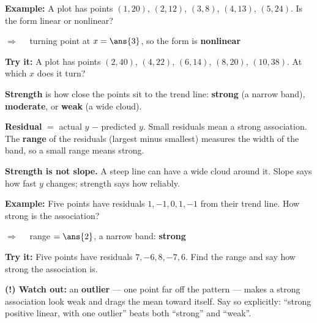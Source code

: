 \documentclass[12pt]{article}
\begin{document}
\begin{examplebox}
\textbf{Example:} \quad A plot has points $(1, 20)$, $(2, 12)$, $(3, 8)$, $(4, 13)$,
$(5, 24)$. Is the form linear or nonlinear?

$\Rightarrow\quad$ turning point at $x = \ans{3}$, so the form is \textbf{nonlinear}
\end{examplebox}

\begin{tryitbox}
\textbf{Try it:} \quad A plot has points $(2, 40)$, $(4, 22)$, $(6, 14)$, $(8, 20)$,
$(10, 38)$. At which $x$ does it turn?\\[2pt]
\end{tryitbox}


\begin{formulabox}
\textbf{Strength} is how close the points sit to the trend line: \textbf{strong} (a narrow
band), \textbf{moderate}, or \textbf{weak} (a wide cloud).\par
\smallskip
\textbf{Residual} $=$ actual $y$ $-$ predicted $y$. Small residuals mean a strong
association. The \textbf{range} of the residuals (largest minus smallest) measures the
width of the band, so a small range means strong.\par
\smallskip
\textbf{Strength is not slope.} A steep line can have a wide cloud around it. Slope says how
fast $y$ changes; strength says how reliably.
\end{formulabox}

\begin{examplebox}
\textbf{Example:} \quad Five points have residuals $1, -1, 0, 1, -1$ from their trend line.
How strong is the association?

$\Rightarrow\quad$ range $= \ans{2}$, a narrow band: \textbf{strong}
\end{examplebox}

\begin{tryitbox}
\textbf{Try it:} \quad Five points have residuals $7, -6, 8, -7, 6$. Find the range and say
how strong the association is.\\[2pt]
\end{tryitbox}

\begin{watchoutbox}
\textbf{(!) Watch out:} an \textbf{outlier} --- one point far off the pattern --- makes a
strong association look weak and drags the mean toward itself. Say so explicitly:
``strong positive linear, with one outlier'' beats both ``strong'' and ``weak''.
\end{watchoutbox}
\end{document}
